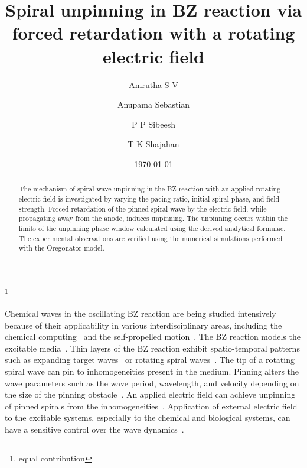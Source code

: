\documentclass[%
 reprint,
 amsmath,amssymb,
 aps,
prb,
]{revtex4-2}
\begin{document}

\title{Spiral unpinning in BZ reaction via forced retardation with a rotating electric field }%


\author{Amrutha S V}
\thanks{equal contribution}%
\author{Anupama Sebastian}%

\author{P P Sibeesh}

\author{T K Shajahan}


\date{\today}%

\begin{abstract}
The mechanism of spiral wave unpinning in the BZ reaction with an applied rotating electric field is investigated by varying the pacing ratio, initial spiral phase, and field strength. Forced retardation of the pinned spiral wave by the electric field, while propagating away from the anode, induces unpinning. The unpinning occurs within the limits of the unpinning phase window calculated using the derived analytical formulae. The experimental observations are verified using the numerical simulations performed with the Oregonator model.
\end{abstract}

                             
\maketitle



Chemical waves in the oscillating BZ reaction are being studied intensively because of their applicability in various interdisciplinary areas, including the chemical computing~\cite{gorecki2022information} and the self-propelled motion~\cite{jin2017chemotaxis, ryabchun2022run}. The BZ reaction models the excitable media~\cite{sinha2014patterns}. Thin layers of the BZ reaction exhibit spatio-temporal patterns such as expanding target waves~\cite{zhang2019stability} or rotating spiral waves~\cite{zykov2018spiral}. The tip of a rotating spiral wave can pin to inhomogeneities present in the medium. Pinning alters the wave parameters such as the wave period, wavelength, and velocity depending on the size of the pinning obstacle~\cite{lim2006spiral, sutthiopad2015propagation}. An applied electric field can achieve unpinning of pinned spirals from the inhomogeneities~\cite{jimenez2013electric,punacha2020theory}. 
Application of external electric field to the excitable systems, especially to the chemical and biological systems, can have a sensitive control over the wave dynamics~\cite{steinbock1992electric,bittihn2012negative,feng2022removal}.
\end{document}
